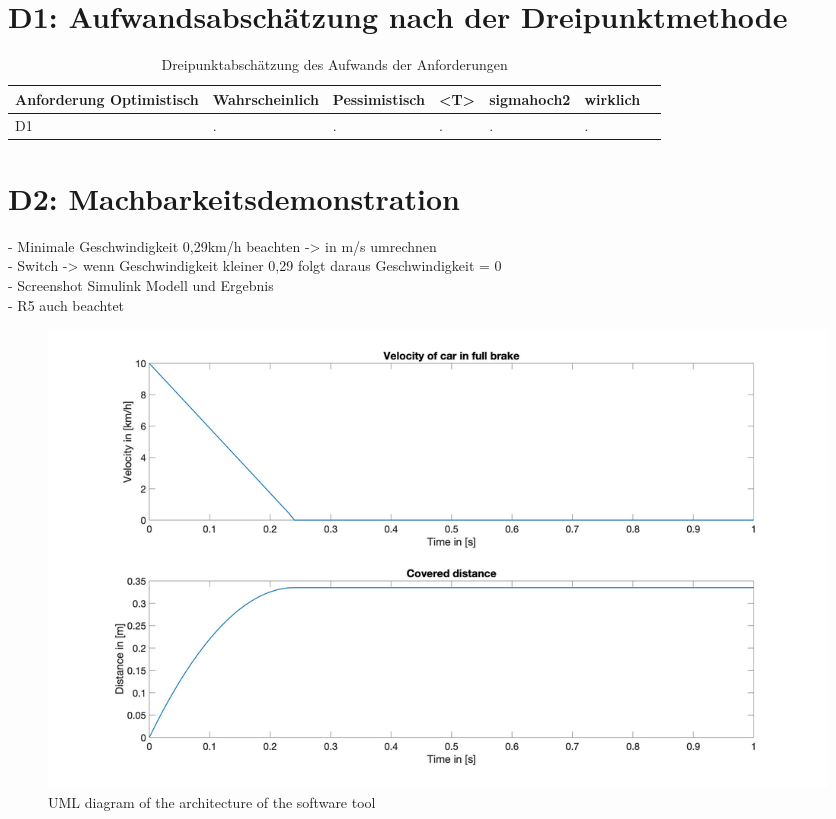 
\chapter{D1: Aufwandsabschätzung nach der Dreipunktmethode}\label{cha:D1}
\begin{table}[H]
\centering
\caption{Dreipunktabschätzung des Aufwands der Anforderungen}
\begin{adjustbox}{width=1\textwidth, center=\textwidth}
\renewcommand{\arraystretch}{1}
\begin{tabular}{lllllll}
\textbf{Anforderung} \textbf{Optimistisch} & \textbf{Wahrscheinlich} & \textbf{Pessimistisch} & \textbf{<T>} & \textbf{sigmahoch2} & \textbf{wirklich}\\\hline
D1 & .& .& .& .& .&\\
\end{tabular}

\end{adjustbox}
\label{tbl:ConceptTPTPProductionSymbols}
\end{table}
\chapter{D2: Machbarkeitsdemonstration}\label{cha:D2}

- Minimale Geschwindigkeit 0,29km/h beachten -> in m/s umrechnen \\
- Switch -> wenn Geschwindigkeit kleiner 0,29 folgt daraus Geschwindigkeit = 0 \\
- Screenshot Simulink Modell und Ergebnis\\
- R5 auch beachtet \\

\begin{figure}[H]
\centering
\includegraphics[width=1\textwidth]{images/D2_plot.jpg}
\caption{UML diagram of the architecture of the software tool}
\label{fig:ConceptArchitectureOverview}
\end{figure}


